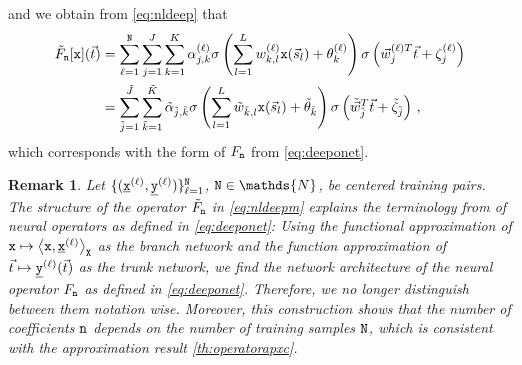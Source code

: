 \documentclass[10pt]{article}
\numberwithin{equation}{section}
\newtheorem{remark}[remark]{Remark}
\theoremstyle{nonumberplain}
\newcommand{\N}{\mathds{N}}
\newcommand{\inner}[2]{\left<#1,#2\right>}
\newcommand{\bs}{\vec{s}}
\newcommand{\bt}{\vec{t}}
\newcommand{\bw}{{\vec{w}}}
\newcommand{\X}{{\tt X}}
\newcommand{\y}{{\tt y}}
\newcommand{\n}{{\tt n}}
\newcommand{\x}{{\tt x}}
\newcommand{\ulx}{\underline{\x}}
\newcommand{\uly}{\underline{\y}}
\newcommand{\no}{{\tt N}}
\begin{document}
     and we obtain from \autoref{eq:nldeep} that
	\begin{equation} \label{eq:nldeepm}
		\begin{aligned}
			\tilde{F}_\n[\x](\bt) 
			&=\sum_{\ell=1}^\no \sum_{j=1}^{J} \sum_{k=1}^{K}\alpha_{j,k}^{(\ell)}\sigma \left(\sum_{l=1}^{L}w_{k,l}^{(\ell)}\x(\bs_l) + \theta_k^{(\ell)}\right) \sigma\left(\bw_j^{(\ell) T}\bt+\zeta_j^{(\ell)}\right)\\
			&=\sum_{\tilde{j}=1}^{\tilde{J}} \sum_{\tilde{k}=1}^{\tilde{K}}\tilde{\alpha}_{\tilde{j},\tilde{k}}\sigma \left(\sum_{l=1}^{L}\tilde{w}_{\tilde{k},l}\x(\bs_l) + \tilde{\theta}_{\tilde{k}}\right) \sigma\left(\tilde{\bw}_{\tilde{j}} ^{T}\bt+\tilde{\zeta}_{\tilde{j}}\right)\,,
		\end{aligned}
	\end{equation}
which corresponds with the form of $F_\n$ from \autoref{eq:deeponet}.

\begin{remark}
Let $\{(\ulx^{(\ell)},\uly^{(\ell)})\}_{\ell=1}^{\no}$, $\no \in \N$, be centered training pairs. The structure of the operator $\tilde{F}_\n$ in \autoref{eq:nldeepm} explains the terminology from \cite{LiKovAziLiuBha20_report} of neural operators as defined in \autoref{eq:deeponet}: Using the functional approximation of $\x \mapsto \inner{\x}{\ulx^{(\ell)}}_\X$ as the \emph{branch network} and the function approximation of $\bt \mapsto \uly^{(\ell)}(\bt)$ as the \emph{trunk network}, we find the network architecture of the neural operator $F_\n$ as defined in \autoref{eq:deeponet}. Therefore, we no longer distinguish between them notation wise. Moreover, this construction shows that the number of coefficients $\n$ depends on the number of training samples $\no$, which is consistent with the approximation result \autoref{th:operatorapxc}.
\end{remark}
\end{document}
